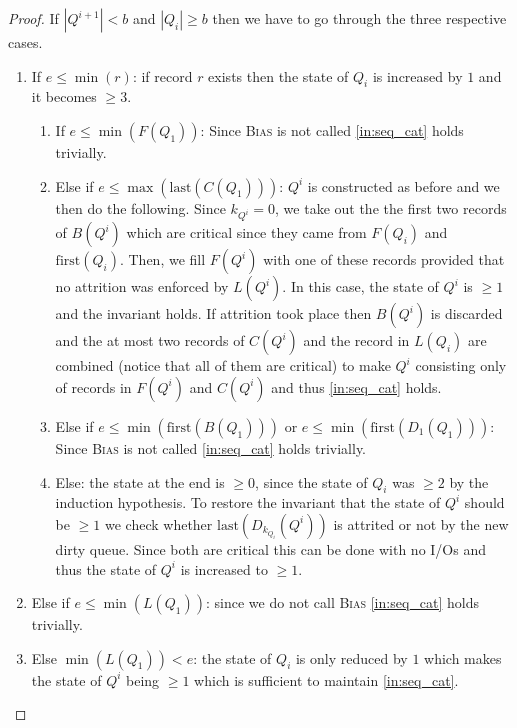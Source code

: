 \documentclass{sig-alternate}
\newcommand{\first}{\text{first}}
\newcommand{\last}{\text{last}}
\newcommand{\iref}[1]{\ref{#1}} \newcommand{\attr}[1]{\widetilde{#1}}
\renewcommand{\(}{\left(}
\renewcommand{\)}{\right)}
\begin{document}
\begin{fullenv}
\begin{proof}
If $|Q^{i+1}|<b$ and $|Q_i| \geq b$ then we have to go through the three
respective cases.
\begin{enumerate}
  \item If $e \leq \min(r)$: if record $r$ exists then the state of $Q_i$ is
    increased by $1$ and it becomes $\geq 3$.
  \begin{enumerate}[label=\arabic*)]
    \item If $e \leq \min(F(Q_1))$: Since \textsc{Bias} is not called
      \iref{in:seq_cat} holds trivially.

    \item Else if $e \leq \max(\last(C(Q_1)))$: $Q^i$ is constructed as before
      and we then do the following. Since $k_{Q^{i}}=0$, we take
      out the the first two records of $B(Q^i)$ which are critical since they
      came from $F(Q_i)$ and $\first(Q_i)$. Then, we fill $F(Q^i)$ with one of
      these records provided that no attrition was enforced by $L(Q^i)$. In
      this case, the state of $Q^i$ is $\geq 1$ and the invariant holds. If
      attrition took place then $B(Q^i)$ is discarded and the at most two
      records of $C(Q^i)$ and the record in $L(Q_i)$ are combined (notice that
      all of them are critical) to make $Q^i$ consisting only of records in
      $F(Q^i)$ and $C(Q^i)$ and thus \iref{in:seq_cat} holds.

    \item Else if $e \leq \min(\first(B(Q_1)))$ or $e \leq
      \min(\first(D_1(Q_1)))$: Since \textsc{Bias} is not called 
      \iref{in:seq_cat} holds trivially.

    \item Else: the state at the end is $\geq 0$, since the state of $Q_i$ was
      $\geq 2$ by the induction hypothesis. To restore the invariant that the
      state of $Q^i$ should be $\geq 1$ we check whether
      $\last(D_{k_{Q_i}}(Q^i))$ is attrited or not by the new dirty queue.
      Since both are critical this can be done with no I/Os and thus the state
      of $Q^i$ is increased to $\geq 1$.
  \end{enumerate}

  \item Else if $e \leq \min(L(Q_1))$: since we do not call \textsc{Bias}
    \iref{in:seq_cat} holds trivially.

  \item Else $\min(L(Q_1)) < e$: the state of $Q_i$ is only reduced by $1$ which
    makes the state of $Q^i$ being $\geq 1$ which is sufficient to maintain
    \iref{in:seq_cat}.
\end{enumerate}




\end{proof}
\end{fullenv}
\end{document}
